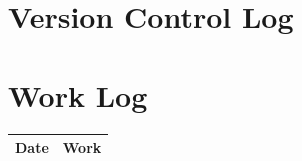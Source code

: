 \documentclass[onecolumn,draftclsnofoot, 10pt, compsoc]{IEEEtran}
\begin{document}
\section{Version Control Log}


\section{Work Log}
	\begin{center}
		\begin{tabular}{ |p{2cm}|p{12cm}| }
			\hline
			Date & Work \\
			\hline
		\end{tabular}
	\end{center}


\bibdata{}


\end{document}
